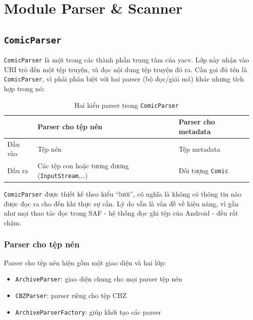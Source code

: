 \documentclass[../../../../thesis]{subfiles}
\begin{document}
\section{Module Parser \& Scanner}\label{parser-scanner-module}



\subsection{\texttt{ComicParser}}

\texttt{ComicParser} là một trong các thành phần trung tâm của yacv. Lớp này
nhận vào URI trỏ đến một tệp truyện, và đọc nội dung tệp truyện đó ra. Cần gọi
đủ tên là \texttt{ComicParser}, vì phải phân biệt với hai parser (bộ đọc/giải
mã) khác nhưng tích hợp trong nó:

\begin{table}[H]
    \centering
    \caption{Hai kiểu parser trong \texttt{ComicParser}}
    \label{tab:2-parsers}
    \begin{tabular}{l p{6cm} l}
        \toprule
                & Parser cho tệp nén & Parser cho metadata \\
        \midrule
        Đầu vào & Tệp nén            & Tệp metadata \\
        Đầu ra  & Các tệp con hoặc tương đương (\texttt{InputStream},\ldots) & Đối tượng \texttt{Comic} \\
        \bottomrule
    \end{tabular}
\end{table}

\texttt{ComicParser} được thiết kế theo kiểu ``lười'', có nghĩa là không có
thông tin nào được đọc ra cho đến khi thực sự cần. Lý do vẫn là vấn đề về hiệu
năng, vì gần như mọi thao tác đọc trong SAF - hệ thống đọc ghi tệp của Android -
đều rất chậm.

\subsubsection{Parser cho tệp nén}

Parser cho tệp nén hiện gồm một giao diện và hai lớp:

\begin{itemize}
    \item
        \texttt{ArchiveParser}: giao diện chung cho mọi parser tệp nén
    \item
        \texttt{CBZParser}: parser riêng cho tệp CBZ
    \item
        \texttt{ArchiveParserFactory}: giúp khởi tạo các parser
\end{itemize}
\end{document}
